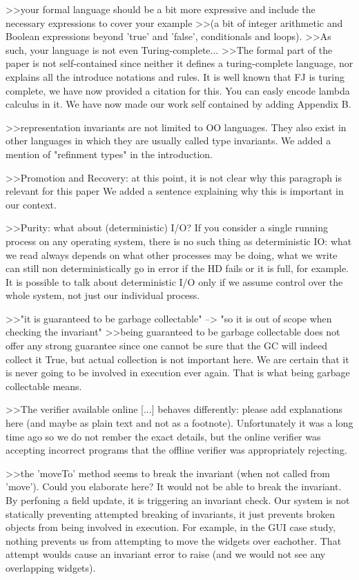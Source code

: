 >>your formal language should be a bit more expressive and include the necessary expressions to cover your example 
>>(a bit of integer arithmetic and Boolean expressions beyond 'true' and 'false', conditionals and loops).
>>As such, your language is not even Turing-complete...
>>The formal part of the paper is not self-contained since neither it defines a turing-complete language, nor explains all the introduce notations and rules.
It is well known that FJ is turing complete, we have now provided a citation for this. You can easly encode lambda calculus in it.
We have now made our work self contained by adding Appendix B.


>>representation invariants are not limited to OO languages. They also exist in other languages in which they are usually called type invariants.
We added a mention of "refinment types" in the introduction.


>>Promotion and Recovery: at this point, it is not clear why this paragraph is relevant for this paper
We added a sentence explaining why this is important in our context.

>>Purity: what about (deterministic) I/O?
If you consider a single running process on any operating system, there is no such thing as deterministic IO:
what we read always depends on what other processes may be doing,
what we write can still non deterministically go in error if the HD fails or it is full, for example.
It is possible to talk about deterministic I/O only if we assume control over the whole system, not just our individual process.

>>"it is guaranteed to be garbage collectable" --> "so it is out of scope when checking the invariant" 
>>being guaranteed to be garbage collectable does not offer any strong guarantee since one cannot be sure that the GC will indeed collect it
True, but actual collection is not important here. We are certain that it is never going to be involved in execution ever again.
That is what being garbage collectable means.


>>The verifier available online [...] behaves differently: please add explanations here (and maybe as plain text and not as a footnote).
Unfortunately it was a long time ago so we do not rember the exact details, but the online verifier was accepting incorrect programs that the offline verifier was appropriately rejecting.

>>the 'moveTo' method seems to break the invariant (when not called from 'move'). Could you elaborate here?
It would not be able to break the invariant.
By perfoning a field update, it is triggering an invariant check.
Our system is not statically preventing attempted breaking of invariants, it just prevents broken objects from being involved in execution.
For example, in the GUI case study, nothing prevents us from attempting to move the widgets over eachother.
That attempt woulds cause an invariant error to raise (and we would not see any overlapping widgets).

